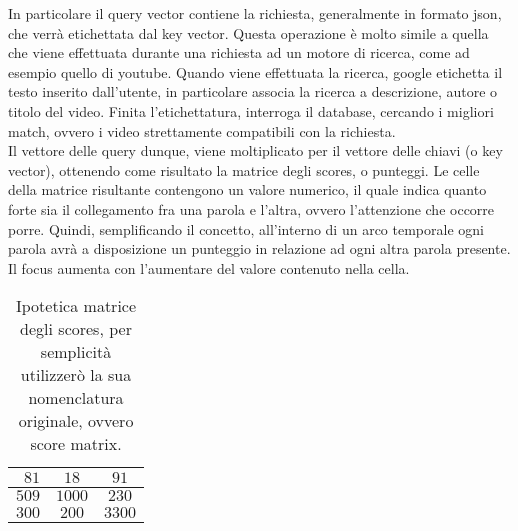 In particolare il query vector contiene la richiesta, generalmente in formato json, che verrà etichettata dal key vector. Questa operazione è molto simile a quella che viene effettuata durante una richiesta ad un motore di ricerca, come ad esempio quello di youtube. Quando viene effettuata la ricerca, google etichetta il testo inserito dall'utente, in particolare associa la ricerca a descrizione, autore o titolo del video. Finita l'etichettatura, interroga il database, cercando i migliori match, ovvero i video strettamente compatibili con la richiesta.
\\
Il vettore delle query dunque, viene moltiplicato per il vettore delle chiavi (o key vector), ottenendo come risultato la matrice degli scores, o punteggi. Le celle della matrice risultante contengono un valore numerico, il quale indica quanto forte sia il collegamento fra una parola e l'altra, ovvero l'attenzione che occorre porre. Quindi, semplificando il concetto, all'interno di un arco temporale ogni parola avrà a disposizione un punteggio in relazione ad ogni altra parola presente. Il focus aumenta con l'aumentare del valore contenuto nella cella.
\begin{table}[h]                        %
	\begin{center}                          %
		\begin{tabular}{r|c|c}                  %
			\hline \hline                           %
			$81$ & $18$ & $91$\\           %
			\hline                                  %
			$509$ & $1000$ & $230$\\           %
			\hline                                  %
			$300$ & $200$ & $3300$\\
			\hline \hline                           %
		\end{tabular}
		\caption[legenda elenco tabelle]{Ipotetica matrice degli scores, per semplicità utilizzerò la sua nomenclatura originale, ovvero score matrix.}
	\end{center}
\end{table}

